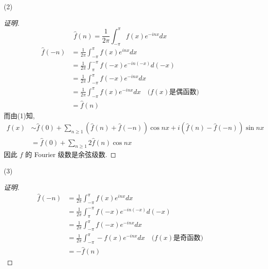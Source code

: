 \documentclass{article}
\begin{document}
\begin{enumerate}
\begin{enumerate}
        \item[(2)] \begin{proof}[证明]
            \begin{equation}
                \hat{f}(n)=\frac{1}{2\pi}\int_{-\pi}^{\pi}f(x)e^{-inx}dx
            \end{equation}
            \begin{equation}
                \begin{aligned}
                    \hat{f}(-n)
                    &=\frac{1}{2\pi}\int_{-\pi}^{\pi}f(x)e^{inx}dx \\
                    &=\frac{1}{2\pi}\int_{\pi}^{-\pi}f(-x)e^{-in(-x)}d(-x) \\
                    &=\frac{1}{2\pi}\int_{-\pi}^{\pi}f(-x)e^{-inx}dx \\
                    &=\frac{1}{2\pi}\int_{-\pi}^{\pi}f(x)e^{-inx}dx \quad\text{($f(x)$是偶函数)}\\
                    &=\hat{f}(n)
                \end{aligned}
            \end{equation}
            而由(1)知, \begin{equation}
                \begin{aligned}
                    f(x)
                    &\sim\hat{f}(0)+\sum_{n\geq1}(\hat{f}(n)+\hat{f}(-n))\cos nx+i(\hat{f}(n)-\hat{f}(-n))\sin nx \\
                    &=\hat{f}(0)+\sum_{n\geq1}2\hat{f}(n)\cos nx
                \end{aligned}
            \end{equation}
            因此 $f$ 的 Fourier 级数是余弦级数.
        \end{proof}
        \item[(3)] \begin{proof}[证明]
            \begin{equation}
                \begin{aligned}
                    \hat{f}(-n)
                    &=\frac{1}{2\pi}\int_{-\pi}^{\pi}f(x)e^{inx}dx \\
                    &=\frac{1}{2\pi}\int_{\pi}^{-\pi}f(-x)e^{-in(-x)}d(-x) \\
                    &=\frac{1}{2\pi}\int_{-\pi}^{\pi}f(-x)e^{-inx}dx \\
                    &=\frac{1}{2\pi}\int_{-\pi}^{\pi}-f(x)e^{-inx}dx \quad\text{($f(x)$是奇函数)}\\
                    &=-\hat{f}(n)

\end{aligned}
\end{equation}
\end{proof}
\end{enumerate}
\end{enumerate}
\end{document}
